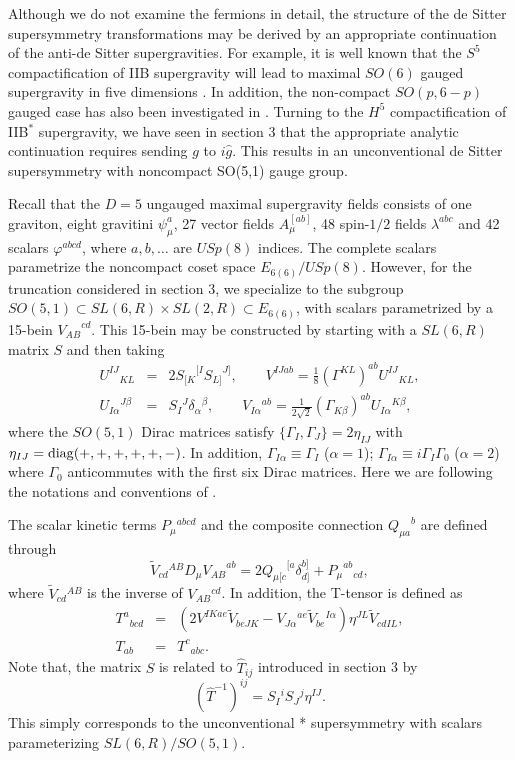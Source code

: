 \documentclass[a4paper,12pt]{article}
\newcommand{\fft}[2]{{\frac{#1}{#2}}}
\begin{document}
Although we do not examine the fermions in detail, the structure of the
de Sitter supersymmetry transformations may be derived by an appropriate
continuation of the anti-de Sitter supergravities.  For example, it is well
known that the $S^5$ compactification of IIB supergravity will lead to
maximal $SO(6)$ gauged supergravity in five dimensions
\cite{Gunaydin:1984qu,Pernici:ju,Gunaydin}.  In addition, the
non-compact $SO(p,6-p)$ gauged case has also been investigated in
\cite{Gunaydin}.  Turning to the $H^5$ compactification of IIB$^*$
supergravity, we have seen in section 3 that the appropriate analytic
continuation requires sending $g$ to $i\hat g$.  This results in an
unconventional de Sitter supersymmetry with noncompact SO(5,1) gauge group.

Recall that the $D=5$ ungauged maximal supergravity fields consists of
one graviton, eight gravitini $\psi^a_\mu$, 27 vector fields $A^{[ab]}_\mu$,
48 spin-$1/2$ fields $\lambda^{abc}$ and 42 scalars $\varphi^{abcd}$, 
where $a,b,\ldots$ are $USp(8)$ indices.  The complete scalars parametrize
the noncompact coset space $E_{6(6)}/USp(8)$.  However, for the truncation
considered in section 3, we specialize to the subgroup $SO(5,1)\subset
SL(6,R)\times SL(2,R)\subset E_{6(6)}$, with scalars parametrized by a
15-bein ${V_{AB}}^{cd}$. This 15-bein may be constructed by starting
with a $SL(6,R)$ matrix $S$ and then taking
%
\begin{eqnarray}
U^{IJ}{}_{KL}&=&2{S_{[K}}^{[I}{S_{L]}}^{J]},\qquad
V^{IJab}=\fft18(\Gamma^{KL})^{ab}{U^{IJ}}_{KL},\nonumber\\
U_{I\alpha}{}^{J\beta}&=&S_I{}^J\delta_\alpha{}^\beta,\qquad
V_{I\alpha}{}^{ab}=\fft1{2\sqrt{2}}(\Gamma_{K\beta})^{ab}U_{I\alpha}{}^{K\beta},
\end{eqnarray}
%
where the $SO(5,1)$ Dirac matrices satisfy $\{\Gamma_I,\Gamma_J\}=2\eta_{IJ}$
with $\eta_{IJ}={\rm diag}(+,+,+,+,+,-)$.  In addition,
$\Gamma_{I\alpha}\equiv\Gamma_I$ ($\alpha=1$);
$\Gamma_{I\alpha}\equiv i\Gamma_I\Gamma_0$ ($\alpha=2$) where $\Gamma_0$
anticommutes with the first six Dirac matrices.  Here we are following the
notations and conventions of \cite{Gunaydin}.

The scalar kinetic terms $P_\mu{}^{abcd}$ and the composite connection
${Q_{\mu a}}^b$ are defined through
%
\begin{equation}
\tilde{V}_{cd}{}^{AB}D_{\mu}{V_{AB}}^{ab}=2{Q_{\mu [c}}^{[a}\delta_{d]}^{b]}
+ {P_{\mu}}^{ab}{}_{cd},
\end{equation}
%
where $\tilde{V}_{cd}{}^{AB}$ is the inverse of $V_{AB}{}^{cd}$.
In addition, the T-tensor is defined as 
%
\begin{eqnarray}
{T^a}_{bcd}&=&(2V^{IKae}\tilde{V}_{beJK}-V_{J\alpha}{}^{ae}\tilde
V_{be}{}^{I\alpha})\eta^{JL}\tilde{V}_{cdIL}, \\
T_{ab}&=&{T^c}_{abc}.
\end{eqnarray}
%
Note that, the matrix $S$ is related to $\hat T_{ij}$ introduced in
section 3 by
%
\begin{equation}
(\hat T^{-1})^{ij}=S_I{}^iS_J{}^j\eta^{IJ}.
\end{equation}
%
This simply corresponds to the unconventional * supersymmetry with scalars
parameterizing $SL(6,R)/SO(5,1)$.
\end{document}

